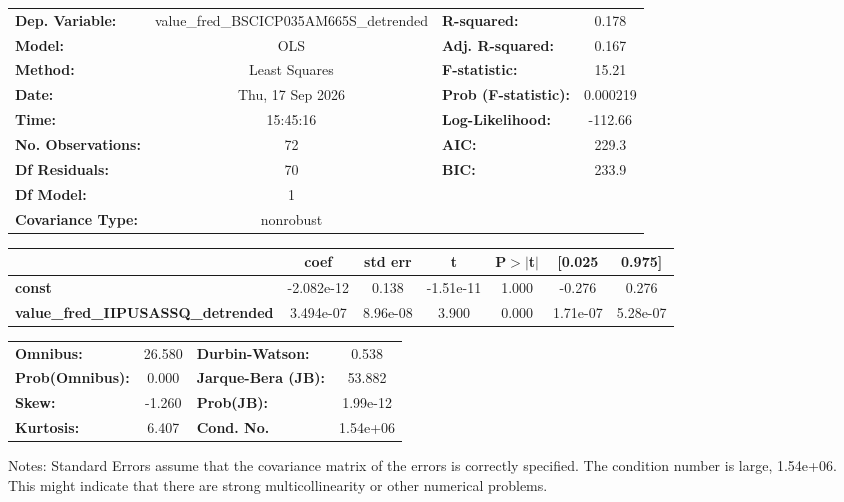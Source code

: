 \begin{center}
\begin{tabular}{lclc}
\toprule
\textbf{Dep. Variable:}                    & value\_fred\_BSCICP035AM665S\_detrended & \textbf{  R-squared:         } &     0.178   \\
\textbf{Model:}                            &                   OLS                   & \textbf{  Adj. R-squared:    } &     0.167   \\
\textbf{Method:}                           &              Least Squares              & \textbf{  F-statistic:       } &     15.21   \\
\textbf{Date:}                             &             Thu, 17 Sep 2026            & \textbf{  Prob (F-statistic):} &  0.000219   \\
\textbf{Time:}                             &                 15:45:16                & \textbf{  Log-Likelihood:    } &   -112.66   \\
\textbf{No. Observations:}                 &                      72                 & \textbf{  AIC:               } &     229.3   \\
\textbf{Df Residuals:}                     &                      70                 & \textbf{  BIC:               } &     233.9   \\
\textbf{Df Model:}                         &                       1                 & \textbf{                     } &             \\
\textbf{Covariance Type:}                  &                nonrobust                & \textbf{                     } &             \\
\bottomrule
\end{tabular}
\begin{tabular}{lcccccc}
                                           & \textbf{coef} & \textbf{std err} & \textbf{t} & \textbf{P$> |$t$|$} & \textbf{[0.025} & \textbf{0.975]}  \\
\midrule
\textbf{const}                             &   -2.082e-12  &        0.138     & -1.51e-11  &         1.000        &       -0.276    &        0.276     \\
\textbf{value\_fred\_IIPUSASSQ\_detrended} &    3.494e-07  &     8.96e-08     &     3.900  &         0.000        &     1.71e-07    &     5.28e-07     \\
\bottomrule
\end{tabular}
\begin{tabular}{lclc}
\textbf{Omnibus:}       & 26.580 & \textbf{  Durbin-Watson:     } &    0.538  \\
\textbf{Prob(Omnibus):} &  0.000 & \textbf{  Jarque-Bera (JB):  } &   53.882  \\
\textbf{Skew:}          & -1.260 & \textbf{  Prob(JB):          } & 1.99e-12  \\
\textbf{Kurtosis:}      &  6.407 & \textbf{  Cond. No.          } & 1.54e+06  \\
\bottomrule
\end{tabular}
\end{center}

Notes: \newline
 [1] Standard Errors assume that the covariance matrix of the errors is correctly specified. \newline
 [2] The condition number is large, 1.54e+06. This might indicate that there are \newline
 strong multicollinearity or other numerical problems.